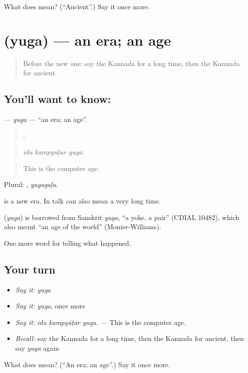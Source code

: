 \begin{tcolorbox}[breakable,colback=teal!4,colframe=teal!35!black,title={Before you move on}]
What does  mean? (\textquotedblleft{}Ancient\textquotedblright{}.) Say it once more.
\end{tcolorbox}
\section[\texorpdfstring{\kn{ಯುಗ} (yuga)}{ಯುಗ (yuga)}]{ (yuga) — an era; an age}

\label{lesson:KA-C331-yuga}



\begin{quote}
Before the new one: say the Kannada for a long time, then the Kannada for ancient.
\end{quote}

\subsection*{You'll want to know: }
\textbf{} — \emph{yuga} — \textquotedblleft{}an era; an age\textquotedblright{}.

\begin{quote}
  .
\end{quote}

\begin{quote}
\emph{idu kampyūṭar yuga.}
\end{quote}

\begin{quote}
This is the computer age.
\end{quote}

Plural: , \emph{yugagaḷu}.

  is a new era. In talk  can also mean a very long time.

\begin{cousinweb}
\textbf{} (\emph{yuga}) is borrowed from Sanskrit \emph{yuga}, \textquotedblleft{}a yoke, a pair\textquotedblright{} (CDIAL 10482), which also meant \textquotedblleft{}an age of the world\textquotedblright{} (Monier-Williams).
\end{cousinweb}

\begin{grammarlens}[title={What you've built}]
One more word for telling what happened.
\end{grammarlens}

\subsection*{Your turn}
\begin{itemize}
\raggedright
  \item \emph{Say it:} \emph{yuga}
  \item \emph{Say it:} \emph{yuga}, once more
  \item \emph{Say it:} \emph{idu kampyūṭar yuga.} — This is the computer age.
  \item \emph{Recall:} say the Kannada for a long time, then the Kannada for ancient, then say \emph{yuga} again
\end{itemize}

\begin{tcolorbox}[breakable,colback=teal!4,colframe=teal!35!black,title={Before you move on}]
What does  mean? (\textquotedblleft{}An era; an age\textquotedblright{}.) Say it once more.
\end{tcolorbox}
